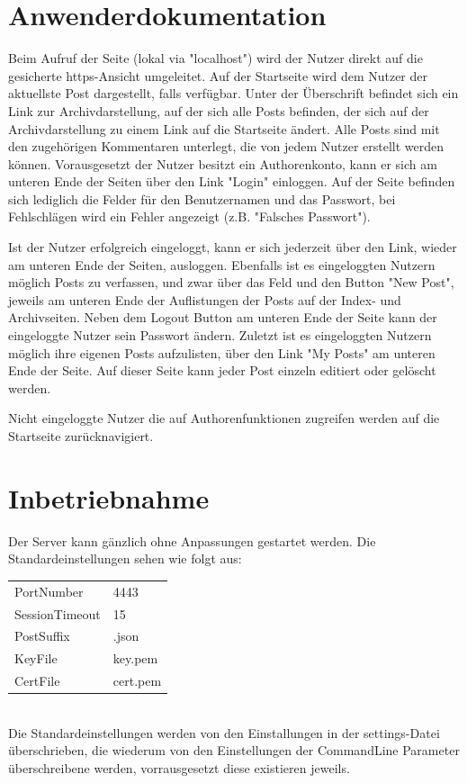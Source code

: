 \documentclass[10pt]{article}
\begin{document}
	\section{Anwenderdokumentation}
	Beim Aufruf der Seite (lokal via "localhost") wird der Nutzer direkt auf die gesicherte https-Ansicht umgeleitet.
	Auf der Startseite wird dem Nutzer der aktuellste Post dargestellt, falls verf\"ugbar.
	Unter der \"Uberschrift befindet sich ein Link zur Archivdarstellung, auf der sich alle Posts befinden, der sich auf der Archivdarstellung zu einem Link auf die Startseite \"andert.
	Alle Posts sind mit den zugeh\"origen Kommentaren unterlegt, die von jedem Nutzer erstellt werden k\"onnen.
	Vorausgesetzt der Nutzer besitzt ein Authorenkonto, kann er sich am unteren Ende der Seiten \"uber den Link "Login" einloggen.
	Auf der Seite befinden sich lediglich die Felder f\"ur den Benutzernamen und das Passwort, bei Fehlschl\"agen wird ein Fehler angezeigt (z.B. "Falsches Passwort").
	
	Ist der Nutzer erfolgreich eingeloggt, kann er sich jederzeit \"uber den Link, wieder am unteren Ende der Seiten, ausloggen.
	Ebenfalls ist es eingeloggten Nutzern m\"oglich Posts zu verfassen, und zwar \"uber das Feld und den Button "New Post", jeweils am unteren Ende der Auflistungen der Posts auf der Index- und Archivseiten.
	Neben dem Logout Button am unteren Ende der Seite kann der eingeloggte Nutzer sein Passwort \"andern.
	Zuletzt ist es eingeloggten Nutzern m\"oglich ihre eigenen Posts aufzulisten, \"uber den Link "My Posts" am unteren Ende der Seite.
	Auf dieser Seite kann jeder Post einzeln editiert oder gel\"oscht werden.
	
	Nicht eingeloggte Nutzer die auf Authorenfunktionen zugreifen werden auf die Startseite zur\"ucknavigiert.
	\section{Inbetriebnahme}
		Der Server kann g\"anzlich ohne Anpassungen gestartet werden.
		Die Standardeinstellungen sehen wie folgt aus:
		\begin{tabular}{l|l}
			PortNumber &     4443\\
			SessionTimeout & 15\\
			PostSuffix & .json\\
			KeyFile & key.pem\\
			CertFile & cert.pem\\
		\end{tabular}\\
		Die Standardeinstellungen werden von den Einstallungen in der settings-Datei \"uberschrieben, die wiederum von den Einstellungen der CommandLine Parameter \"uberschreibene werden, vorrausgesetzt diese existieren jeweils.
\end{document}
